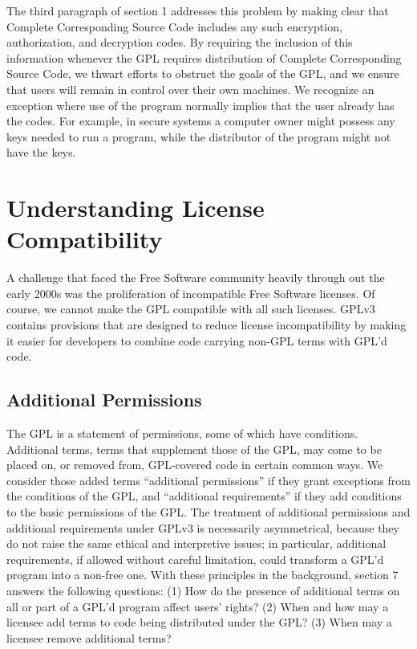 The third paragraph of section 1 addresses this problem by making clear that
Complete Corresponding Source Code includes any such encryption,
authorization, and decryption codes. By requiring the inclusion of this
information whenever the GPL requires distribution of Complete Corresponding
Source Code, we thwart efforts to obstruct the goals of the GPL, and we
ensure that users will remain in control over their own machines. We
recognize an exception where use of the program normally implies that the
user already has the codes. For example, in secure systems a computer owner
might possess any keys needed to run a program, while the distributor of the
program might not have the keys.



\section{Understanding License Compatibility}
\label{license-compatibility}


A challenge that faced the Free Software community heavily through out the
early 2000s was the proliferation of incompatible Free Software licenses.  Of
course, we cannot make the GPL compatible with all such licenses. GPLv3
contains provisions that are designed to reduce license incompatibility by
making it easier for developers to combine code carrying non-GPL terms with
GPL'd code.


\subsection{Additional Permissions}


The GPL is a statement of permissions, some of which have conditions.
Additional terms, terms that supplement those of the GPL, may come to be
placed on, or removed from, GPL-covered code in certain common ways.  We
consider those added terms ``additional permissions'' if they grant
exceptions from the conditions of the GPL, and ``additional requirements'' if
they add conditions to the basic permissions of the GPL. The treatment of
additional permissions and additional requirements under GPLv3 is necessarily
asymmetrical, because they do not raise the same ethical and interpretive
issues; in particular, additional requirements, if allowed without careful
limitation, could transform a GPL'd program into a non-free one.  With these
principles in the background, section 7 answers the following questions: (1)
How do the presence of additional terms on all or part of a GPL'd program
affect users' rights? (2) When and how may a licensee add terms to code being
distributed under the GPL? (3) When may a licensee remove additional terms?

